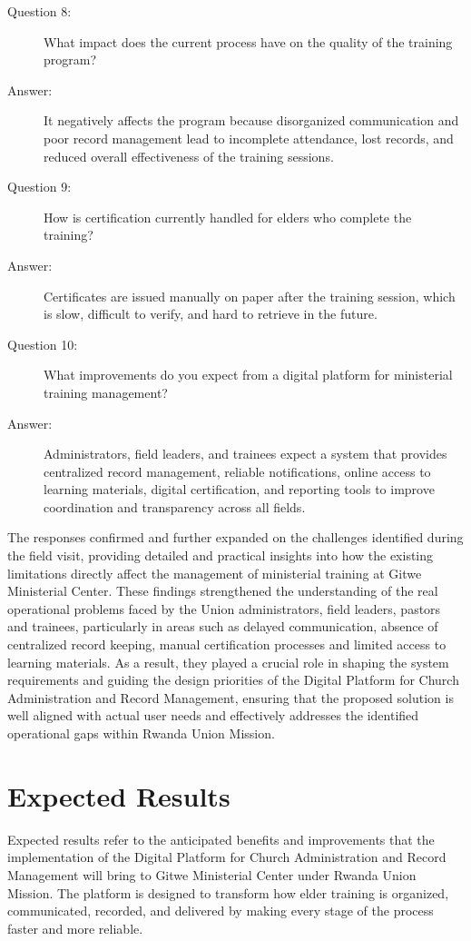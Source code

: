 \documentclass[12pt]{report}
\begin{document}
\begin{description}
    \item[Question 8:] What impact does the current process have on the quality of the training program?
    \item[Answer:] It negatively affects the program because disorganized communication and poor record management lead to incomplete attendance, lost records, and reduced overall effectiveness of the training sessions.
    \item[Question 9:] How is certification currently handled for elders who complete the training?
    \item[Answer:] Certificates are issued manually on paper after the training session, which is slow, difficult to verify, and hard to retrieve in the future.
    \item[Question 10:] What improvements do you expect from a digital platform for ministerial training management?
    \item[Answer:] Administrators, field leaders, and trainees expect a system that provides centralized record management, reliable notifications, online access to learning materials, digital certification, and reporting tools to improve coordination and transparency across all fields.
\end{description}

The responses confirmed and further expanded on the challenges identified during the field visit, providing detailed and practical insights into how the existing limitations directly affect the management of ministerial training at Gitwe Ministerial Center. These findings strengthened the understanding of the real operational problems faced by the Union administrators, field leaders, pastors and trainees, particularly in areas such as delayed communication, absence of centralized record keeping, manual certification processes and limited access to learning materials. As a result, they played a crucial role in shaping the system requirements and guiding the design priorities of the Digital Platform for Church Administration and Record Management, ensuring that the proposed solution is well aligned with actual user needs and effectively addresses the identified operational gaps within Rwanda Union Mission.

\section{Expected Results}
Expected results refer to the anticipated benefits and improvements that the implementation of the Digital Platform for Church Administration and Record Management will bring to Gitwe Ministerial Center under Rwanda Union Mission. The platform is designed to transform how elder training is organized, communicated, recorded, and delivered by making every stage of the process faster and more reliable.
\end{document}
